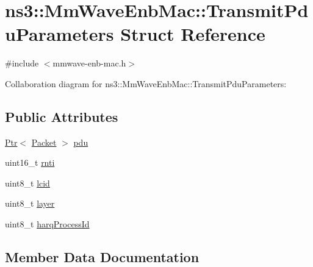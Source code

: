 \hypertarget{structns3_1_1MmWaveEnbMac_1_1TransmitPduParameters}{}\section{ns3\+:\+:Mm\+Wave\+Enb\+Mac\+:\+:Transmit\+Pdu\+Parameters Struct Reference}
\label{structns3_1_1MmWaveEnbMac_1_1TransmitPduParameters}


{\ttfamily \#include $<$mmwave-\/enb-\/mac.\+h$>$}



Collaboration diagram for ns3\+:\+:Mm\+Wave\+Enb\+Mac\+:\+:Transmit\+Pdu\+Parameters\+:
\subsection*{Public Attributes}
\begin{DoxyCompactItemize}
\item 
\hyperlink{classns3_1_1Ptr}{Ptr}$<$ \hyperlink{classns3_1_1Packet}{Packet} $>$ \hyperlink{structns3_1_1MmWaveEnbMac_1_1TransmitPduParameters_ae2207879499b0e96583e604b2ebbf70d}{pdu}
\item 
uint16\+\_\+t \hyperlink{structns3_1_1MmWaveEnbMac_1_1TransmitPduParameters_a023abf8bed0e630826c100021acc8373}{rnti}
\item 
uint8\+\_\+t \hyperlink{structns3_1_1MmWaveEnbMac_1_1TransmitPduParameters_a7c77c0d48096557647af35db42fe1e87}{lcid}
\item 
uint8\+\_\+t \hyperlink{structns3_1_1MmWaveEnbMac_1_1TransmitPduParameters_aca6a6931f952e41a376b038c3dde98aa}{layer}
\item 
uint8\+\_\+t \hyperlink{structns3_1_1MmWaveEnbMac_1_1TransmitPduParameters_a0a8a70f44ff6e9a17c5fa452e67ce590}{harq\+Process\+Id}
\end{DoxyCompactItemize}


\subsection{Member Data Documentation}
